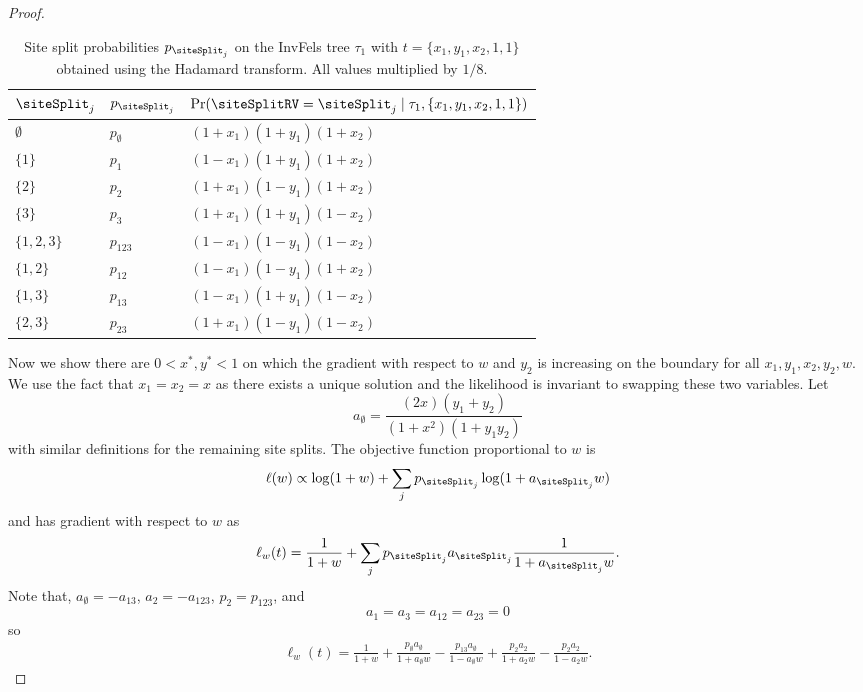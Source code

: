 \begin{proof}
\begin{table}[ht]
\centering
\begin{tabular}{|l|l|l|}
    \hline
$\siteSplit_j$  & $p_{\siteSplit_j}$ &$\Pr(\siteSplitRV=\siteSplit_j \mid \tau_1,\{x_1,y_1,x_2,1,1\})$\\
    \hline
    $\emptyset$ & $p_{\emptyset}$   &$(1+x_1)(1+y_1)(1+x_2)$\\
    $\{1\}$     & $p_{1}$       &$(1-x_1)(1+y_1)(1+x_2)$\\
    $\{2\}$     & $p_{2}$       &$(1+x_1)(1-y_1)(1+x_2)$\\
    $\{3\}$     & $p_{3}$       &$(1+x_1)(1+y_1)(1-x_2)$\\
    $\{1,2,3\}$ & $p_{123}$   &$(1-x_1)(1-y_1)(1-x_2)$\\
    $\{1,2\}$   & $p_{12}$     &$(1-x_1)(1-y_1)(1+x_2)$\\
    $\{1,3\}$   & $p_{13}$     &$(1-x_1)(1+y_1)(1-x_2)$\\
    $\{2,3\}$   & $p_{23}$     &$(1+x_1)(1-y_1)(1-x_2)$\\
    \hline
\end{tabular}
\caption{Site split probabilities $p_{\siteSplit_j}$ on the InvFels tree $\tau_1$ with $t=\{x_1,y_1,x_2,1,1\}$ obtained using the Hadamard transform.
All values multiplied by $1/8$.}
\label{tab:gen-sitepatprob-restricted}
\end{table}

Now we show there are $0 < x^*, y^* < 1$ on which the gradient with respect to $w$ and $y_2$ is increasing on the boundary for all $x_1,y_1,x_2,y_2,w$.
We use the fact that $x_1=x_2=x$ as there exists a unique solution and the likelihood is invariant to swapping these two variables.
Let
\[
a_{\emptyset} = \frac{(2x)(y_1+y_2)}{(1+x^2)(1+y_1y_2)}
\]
with similar definitions for the remaining site splits.
The objective function proportional to $w$ is
\begin{align*}
\ell(w) \propto \log(1+w) + \sum_j p_{\siteSplit_j} \log(1 + a_{\siteSplit_j}w)
\end{align*}
and has gradient with respect to $w$ as
\begin{align*}
\ell_w(t) = \frac{1}{1+w} + \sum_j p_{\siteSplit_j}a_{\siteSplit_j}\frac{1}{1 + a_{\siteSplit_j}w}.
\end{align*}
Note that, $a_{\emptyset} = -a_{13}$, $a_{2} = -a_{123}$, $p_{2} = p_{123}$, and
\[
a_{1} = a_{3} = a_{12} = a_{23} = 0
\]
so
\begin{align*}
\ell_w(t) = \frac{1}{1+w} + \frac{p_{\emptyset}a_{\emptyset}}{1 + a_{\emptyset}w} - \frac{p_{13}a_{\emptyset}}{1 - a_{\emptyset}w} + \frac{p_{2}a_{2}}{1 + a_{2}w} - \frac{p_{2}a_{2}}{1 - a_{2}w}.
\end{align*}


\end{proof}
